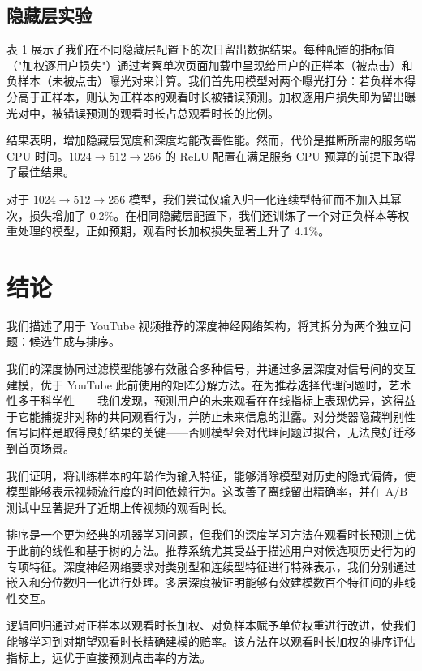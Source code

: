 \subsection{隐藏层实验}

表 1 展示了我们在不同隐藏层配置下的次日留出数据结果。每种配置的指标值（"加权逐用户损失"）通过考察单次页面加载中呈现给用户的正样本（被点击）和负样本（未被点击）曝光对来计算。我们首先用模型对两个曝光打分：若负样本得分高于正样本，则认为正样本的观看时长被错误预测。加权逐用户损失即为留出曝光对中，被错误预测的观看时长占总观看时长的比例。

结果表明，增加隐藏层宽度和深度均能改善性能。然而，代价是推断所需的服务端 CPU 时间。$1024 \rightarrow 512 \rightarrow 256$ 的 ReLU 配置在满足服务 CPU 预算的前提下取得了最佳结果。

对于 $1024 \rightarrow 512 \rightarrow 256$ 模型，我们尝试仅输入归一化连续型特征而不加入其幂次，损失增加了 0.2\%。在相同隐藏层配置下，我们还训练了一个对正负样本等权重处理的模型，正如预期，观看时长加权损失显著上升了 4.1\%。

\section{结论}

我们描述了用于 YouTube 视频推荐的深度神经网络架构，将其拆分为两个独立问题：候选生成与排序。

我们的深度协同过滤模型能够有效融合多种信号，并通过多层深度对信号间的交互建模，优于 YouTube 此前使用的矩阵分解方法。在为推荐选择代理问题时，艺术性多于科学性——我们发现，预测用户的未来观看在在线指标上表现优异，这得益于它能捕捉非对称的共同观看行为，并防止未来信息的泄露。对分类器隐藏判别性信号同样是取得良好结果的关键——否则模型会对代理问题过拟合，无法良好迁移到首页场景。

我们证明，将训练样本的年龄作为输入特征，能够消除模型对历史的隐式偏倚，使模型能够表示视频流行度的时间依赖行为。这改善了离线留出精确率，并在 A/B 测试中显著提升了近期上传视频的观看时长。

排序是一个更为经典的机器学习问题，但我们的深度学习方法在观看时长预测上优于此前的线性和基于树的方法。推荐系统尤其受益于描述用户对候选项历史行为的专项特征。深度神经网络要求对类别型和连续型特征进行特殊表示，我们分别通过嵌入和分位数归一化进行处理。多层深度被证明能够有效建模数百个特征间的非线性交互。

逻辑回归通过对正样本以观看时长加权、对负样本赋予单位权重进行改进，使我们能够学习到对期望观看时长精确建模的赔率。该方法在以观看时长加权的排序评估指标上，远优于直接预测点击率的方法。

